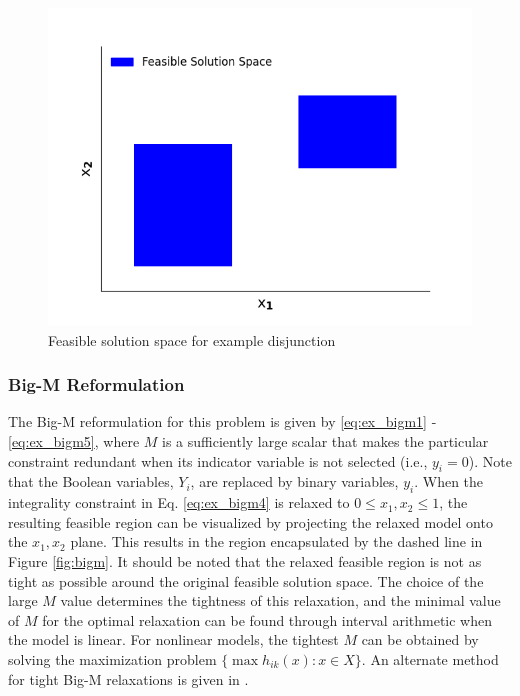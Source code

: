 \documentclass{juliacon}
\begin{document}
\begin{figure}
    \centering
    \includegraphics[scale=0.5]{solnspace.png}
    \caption{Feasible solution space for example disjunction}
    \label{fig:reform_figure}
\end{figure}
\vskip 6pt

 \subsubsection{Big-M Reformulation}
 The Big-M reformulation for this problem is given by \eqref{eq:ex_bigm1} - \eqref{eq:ex_bigm5}, where $M$ is a sufficiently large scalar that makes the particular constraint redundant when its indicator variable is not selected (i.e., $y_i = 0$). Note that the Boolean variables, $Y_i$, are replaced by binary variables, $y_i$. When the integrality constraint in Eq. \eqref{eq:ex_bigm4} is relaxed to $0 \leq x_1, x_2 \leq 1$, the resulting feasible region can be visualized by projecting the relaxed model onto the $x_1, x_2$ plane. This results in the region encapsulated by the dashed line in Figure \ref{fig:bigm}. It should be noted that the relaxed feasible region is not as tight as possible around the original feasible solution space. The choice of the large $M$ value determines the tightness of this relaxation, and the minimal value of $M$ for the optimal relaxation can be found through interval arithmetic when the model is linear. For nonlinear models, the tightest $M$ can be obtained by solving the maximization problem $\{\max h_{ik}(x): x \in X\}$. An alternate method for tight Big-M relaxations is given in \cite{TRESPALACIOS201598}.
 
\end{document}
